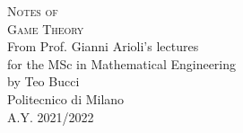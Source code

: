\documentclass[10pt,a4paper,twoside,openright]{book}
\newcounter{es}
\begin{document}

\frontmatter
\pagestyle{empty} %
\vspace*{\fill}
\begin{center}
	{\large \textsc{Notes of}}\\
	\vspace*{0.4cm}
	{\Huge \textsc{Game Theory}}\\
	\vspace*{1cm}
	{\large {From Prof. Gianni Arioli's lectures}}\\
	\vspace*{0.1cm}
	{\large for the MSc in Mathematical Engineering}\\
	\vspace*{0.4cm}
	{\large {by Teo Bucci}}\\
	\vspace*{1cm}
	Politecnico di Milano\\A.Y. 2021/2022
\end{center}
\vspace*{\fill}
\newpage


%
%
%
%
%



\newpage


\tableofcontents

\end{document}
